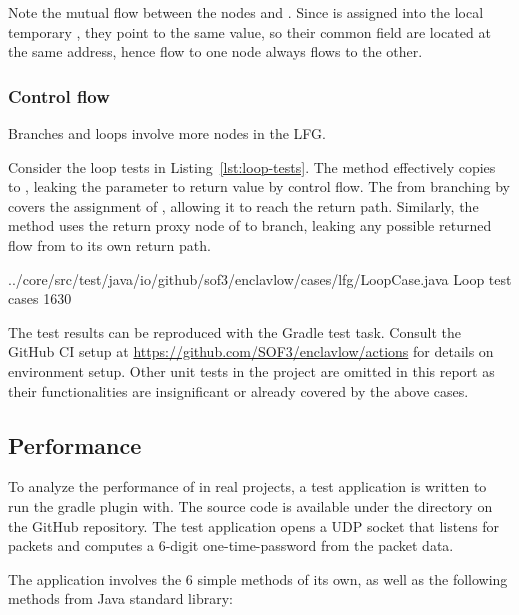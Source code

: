 Note the mutual flow between the nodes
 and
.
Since  is assigned into the local temporary ,
they point to the same value,
so their common field  are located at the same address,
hence flow to one node always flows to the other.

\subsubsection{Control flow}
Branches and loops involve more  nodes in the \ac{LFG}.

Consider the loop tests in Listing~\ref{lst:loop-tests}.
The  method effectively copies  to ,
leaking the parameter to return value by control flow.
The  from branching by  covers the assignment of ,
allowing it to reach the return path.
Similarly, the  method uses
the return proxy node of  to branch,
leaking any possible returned flow from  to its own return path.

{../core/src/test/java/io/github/sof3/enclavlow/cases/lfg/LoopCase.java}
{Loop test cases}
{16}{30}

The test results can be reproduced with the Gradle test task.
Consult the GitHub CI setup at \url{https://github.com/SOF3/enclavlow/actions}
for details on environment setup.
Other unit tests in the project are omitted in this report
as their functionalities are insignificant or already covered by the above cases.

\subsection{Performance}
To analyze the performance of \pname{} in real projects,
a test application is written to run the \pname{} gradle plugin with.
The source code is available under the  directory on the GitHub repository.
The test application opens a UDP socket that listens for packets
and computes a 6-digit one-time-password from the packet data.

The application involves the 6 simple methods of its own,
as well as the following methods from Java standard library:

